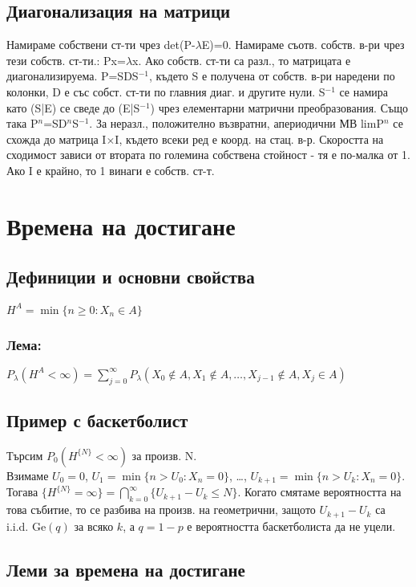 \documentclass{article}
\begin{document}
\subsection{Диагонализация на матрици}
Намираме собствени ст-ти чрез det(P-$\lambda$E)=0. Намираме съотв. собств. в-ри чрез тези собств. ст-ти.: Px=$\lambda$x.
Ако собств. ст-ти са разл., то матрицата е диагонализируема.
P=SDS$^{-1}$, където S е получена от собств. в-ри наредени по колонки, D е със собст. ст-ти по главния диаг. и другите нули. 
S$^{-1}$ се намира като (S|E) се сведе до (E|S$^{-1}$) чрез елементарни матрични преобразования. 
Също така P$^n$=SD$^n$S$^{-1}$. За неразл., положително възвратни, апериодични МВ limP$^n$ се схожда до матрица I$\times$I, където всеки ред е коорд. на стац. в-р. 
Скоростта на сходимост зависи от втората по големина собствена стойност - тя е по-малка от 1. 
Ако I е крайно, то 1 винаги е собств. ст-т.

\section{Времена на достигане}
\subsection{Дефиниции и основни свойства}
$H^A = \min\{n \geq 0 : X_n \in A\}$

\subsubsection*{Лема:}
$P_\lambda(H^A < \infty) = \sum_{j=0}^\infty P_\lambda(X_0 \notin A, X_1 \notin A, \dots, X_{j-1} \notin A, X_j \in A)$

\subsection{Пример с баскетболист}
Търсим $P_0(H^{\{N\}} < \infty)$ за произв. N. \\
Взимаме $U_0 = 0$, $U_1 = \min\{n > U_0 : X_n = 0\}$, \dots, $U_{k+1} = \min\{n > U_k : X_n = 0\}$. 
Тогава $\{H^{\{N\}} = \infty\} = \bigcap_{k=0}^\infty \{U_{k+1} - U_k \leq N\}$. 
Когато смятаме вероятността на това събитие, то се разбива на произв. на геометрични, защото 
$U_{k+1} - U_k$ са i.i.d. $\mathrm{Ge}(q)$ за всяко $k$, а $q = 1 - p$ е вероятността баскетболиста да не уцели.

\subsection{Леми за времена на достигане}
\end{document}
